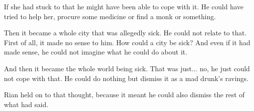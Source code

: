 If she had stuck to that he might have been able to cope with it. 
He could have tried to help her, procure some medicine or find a monk or something. 

Then it became a whole city that was allegedly sick. 
He could not relate to that. 
First of all, it made no sense to him. 
How could a city be sick? 
And even if it had made sense, he could not imagine what he could do about it. 

And then it became the whole world being sick. 
That was just... no, he just could not cope with that. 
He could do nothing but dismiss it as a mad drunk's ravings. 


Rian held on to that thought, because it meant he could also dismiss the rest of what \Uswa{} had said. 











